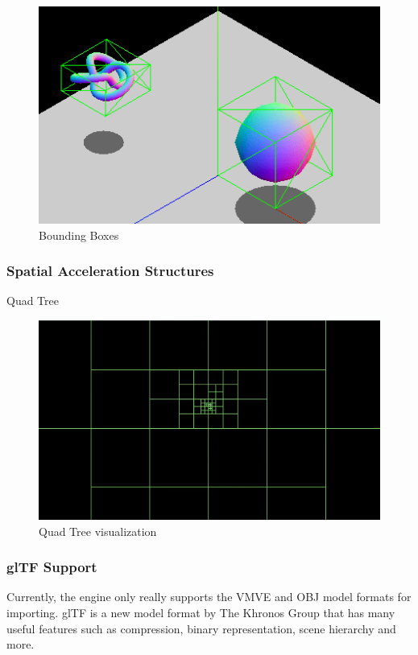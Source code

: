 \documentclass[11pt]{article}
\begin{document}
\begin{figure}[h!]
  \centering
  \includegraphics[width=\textwidth]{images/bounding_boxes.png}
  \caption{Bounding Boxes \cite{bounding_boxes}}
  \label{fig:bounding_boxes}
\end{figure}


\subsubsection{Spatial Acceleration Structures}
Quad Tree

\begin{figure}[h!]
  \centering
  \includegraphics[width=\textwidth]{images/quad_tree.png}
  \caption{Quad Tree visualization}
  \label{fig:quad_tree}
\end{figure}

\subsubsection{glTF Support}
Currently, the engine only really supports the VMVE and OBJ model formats for
importing. glTF is a new model format by The Khronos Group that has many useful
features such as compression, binary representation, scene hierarchy and more.
\end{document}
